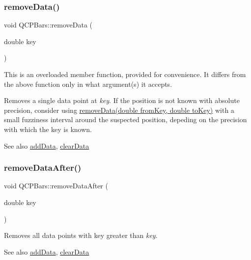 \subsubsection{\texorpdfstring{remove\+Data()}{removeData()}\hspace{0.1cm}{\footnotesize\ttfamily [2/2]}}
{\footnotesize\ttfamily void Q\+C\+P\+Bars\+::remove\+Data (\begin{DoxyParamCaption}\item[{double}]{key }\end{DoxyParamCaption})}

This is an overloaded member function, provided for convenience. It differs from the above function only in what argument(s) it accepts.

Removes a single data point at {\itshape key}. If the position is not known with absolute precision, consider using \hyperlink{class_q_c_p_bars_a1fe9bcb57d670defea1bb65cadf43765}{remove\+Data(double from\+Key, double to\+Key)} with a small fuzziness interval around the suspected position, depeding on the precision with which the key is known.

\begin{DoxySeeAlso}{See also}
\hyperlink{class_q_c_p_bars_a1f29cf08615040993209147fa68de3f2}{add\+Data}, \hyperlink{class_q_c_p_bars_a11dbbd707132f07f862dff13c5789c2b}{clear\+Data} 
\end{DoxySeeAlso}
\hypertarget{class_q_c_p_bars_a99de6e7abbbf03fb41fa604c7f08aa8b}{}\label{class_q_c_p_bars_a99de6e7abbbf03fb41fa604c7f08aa8b} 
\subsubsection{\texorpdfstring{remove\+Data\+After()}{removeDataAfter()}}
{\footnotesize\ttfamily void Q\+C\+P\+Bars\+::remove\+Data\+After (\begin{DoxyParamCaption}\item[{double}]{key }\end{DoxyParamCaption})}

Removes all data points with key greater than {\itshape key}. \begin{DoxySeeAlso}{See also}
\hyperlink{class_q_c_p_bars_a1f29cf08615040993209147fa68de3f2}{add\+Data}, \hyperlink{class_q_c_p_bars_a11dbbd707132f07f862dff13c5789c2b}{clear\+Data} 
\end{DoxySeeAlso}
\hypertarget{class_q_c_p_bars_a9d12779a3fad4820aad2c428f368298d}{}\label{class_q_c_p_bars_a9d12779a3fad4820aad2c428f368298d} 
